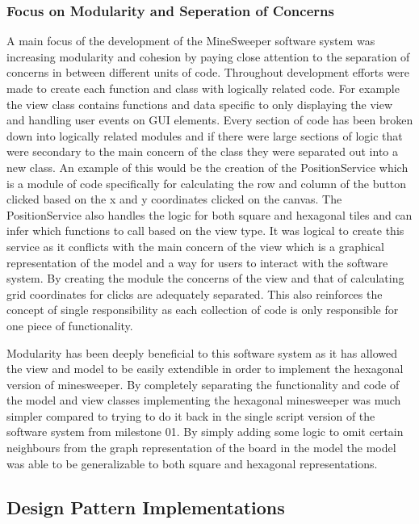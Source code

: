 \documentclass[12pt, a4]{report}
\begin{document}
\subsubsection{Focus on Modularity and Seperation of Concerns}
\par A main focus of the development of the MineSweeper software system was increasing modularity and cohesion by paying close attention to the separation of concerns in between different units of code. Throughout development efforts were made to create each function and class with logically related code. For example the view class contains functions and data specific to only displaying the view and handling user events on GUI elements. Every section of code has been broken down into logically related modules and if there were large sections of logic that were secondary to the main concern of the class they were separated out into a new class. An example of this would be the creation of the PositionService which is a module of code specifically for calculating the row and column of the button clicked based on the x and y coordinates clicked on the canvas. The PositionService also handles the logic for both square and hexagonal tiles and can infer which functions to call based on the view type. It was logical to create this service as it conflicts with the main concern of the view which is a graphical representation of the model and a way for users to interact with the software system. By creating the module the concerns of the view and that of calculating grid coordinates for clicks are adequately separated. This also reinforces the concept of single responsibility as each collection of code is only responsible for one piece of functionality. 
\newline\par
Modularity has been deeply beneficial to this software system as it has allowed the view and model to be easily extendible in order to implement the hexagonal version of minesweeper. By completely separating the functionality and code of the model and view classes implementing the hexagonal minesweeper was much simpler compared to trying to do it back in the single script version of the software system from milestone 01. By simply adding some logic to omit certain neighbours from the graph representation of the board in the model the model was able to be generalizable to both square and hexagonal representations.

\subsection{Design Pattern Implementations}
\end{document}
